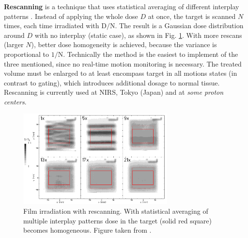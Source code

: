 \documentclass[type=dr, dr=rernat, accentcolor=tud7b,colorbacktitle, bigchapter, openright, twoside, 12pt ]{tudthesis}
\begin{document}
\textbf{Rescanning} is a technique that uses statistical averaging of different interplay patterns \cite{Phillips1992}. Instead of applying the whole dose $D$ at once, the target is scanned $N$ times, each
time irradiated with $\mathrm{D}/\mathrm{N}$. The result is a Gaussian dose distribution around $D$ with no interplay (static case), as shown in Fig. \ref{rescanning}. With more rescans (larger $N$), better dose homogeneity is achieved, because the variance is proportional
to $\mathrm{1}/\mathrm{N}$. Technically the method is the easiest to implement of the three mentioned, since no real-time motion monitoring is necessary. The treated volume must be enlarged to at least encompass target in all motions states (in
contrast to gating), which introduces additional dosage to normal tissue. Rescanning is currently used at NIRS, Tokyo (Japan) and at \textit{some proton centers}.
\newline
\begin{figure}[H]
\begin{center}
\includegraphics[width=0.7\textwidth]{./Images/rescanning.png}
\caption{Film irradiation with rescanning. With statistical averaging of multiple interplay patterns dose in the target (solid red square) becomes homogeneous. Figure taken from \cite{Bert2009}.}
\label{rescanning}
\end{center}
\end{figure}
\end{document}
